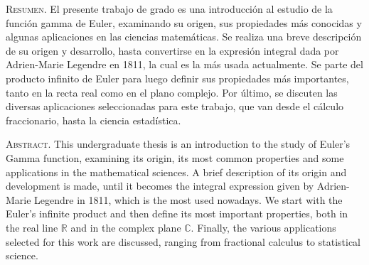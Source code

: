\thispagestyle{empty}

\vspace*{2 cm}

\textsc{Resumen.} El presente trabajo de grado es una introducción al estudio de la función gamma de Euler, examinando su origen, sus propiedades más conocidas y algunas aplicaciones en las ciencias matemáticas. Se realiza una breve descripción de su origen y desarrollo, hasta convertirse en la expresión integral dada por Adrien-Marie Legendre en 1811, la cual es la más usada actualmente. Se parte del producto infinito de Euler para luego definir sus propiedades más importantes, tanto en la recta real como en el plano complejo. Por último, se discuten las diversas aplicaciones seleccionadas para este trabajo, que van desde el cálculo fraccionario, hasta la ciencia estadística.

\vspace{1 cm}

\textsc{Abstract.} This undergraduate thesis is an introduction to the study of Euler’s Gamma function, examining its origin, its most common properties and some applications in the mathematical sciences. A brief description of its origin and development is made, until it becomes the integral expression given by Adrien-Marie Legendre in 1811, which is the most used nowadays. We start with the Euler’s infinite product and then define its most important properties, both in the real line $\mathbb{R}$ and in the complex plane $\mathbb{C}$. Finally, the various applications selected for this work are discussed, ranging from fractional calculus to statistical science.

\newpage
\endinput